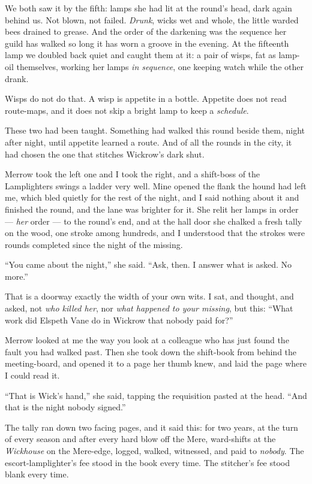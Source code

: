 We both saw it by the fifth: lamps she had lit at the round's head, dark again behind us. Not blown, not failed. \emph{Drunk}, wicks wet and whole, the little warded bees drained to grease. And the order of the darkening was the sequence her guild has walked so long it has worn a groove in the evening. At the fifteenth lamp we doubled back quiet and caught them at it: a pair of wisps, fat as lamp-oil themselves, working her lamps \emph{in sequence}, one keeping watch while the other drank.

Wisps do not do that. A wisp is appetite in a bottle. Appetite does not read route-maps, and it does not skip a bright lamp to keep a \emph{schedule}.

These two had been taught. Something had walked this round beside them, night after night, until appetite learned a route. And of all the rounds in the city, it had chosen the one that stitches Wickrow's dark shut.

Merrow took the left one and I took the right, and a shift-boss of the Lamplighters swings a ladder very well. Mine opened the flank the hound had left me, which bled quietly for the rest of the night, and I said nothing about it and finished the round, and the lane was brighter for it. She relit her lamps in order --- \emph{her} order --- to the round's end, and at the hall door she chalked a fresh tally on the wood, one stroke among hundreds, and I understood that the strokes were rounds completed since the night of the missing.

``You came about the night,'' she said. ``Ask, then. I answer what is asked. No more.''

That is a doorway exactly the width of your own wits. I sat, and thought, and asked, not \emph{who killed her}, nor \emph{what happened to your missing}, but this: ``What work did Elspeth Vane do in Wickrow that nobody paid for?''

Merrow looked at me the way you look at a colleague who has just found the fault you had walked past. Then she took down the shift-book from behind the meeting-board, and opened it to a page her thumb knew, and laid the page where I could read it.

``That is Wick's hand,'' she said, tapping the requisition pasted at the head. ``And that is the night nobody signed.''

The tally ran down two facing pages, and it said this: for two years, at the turn of every season and after every hard blow off the Mere, ward-shifts at the \emph{Wickhouse} on the Mere-edge, logged, walked, witnessed, and paid to \emph{nobody}. The escort-lamplighter's fee stood in the book every time. The stitcher's fee stood blank every time.

